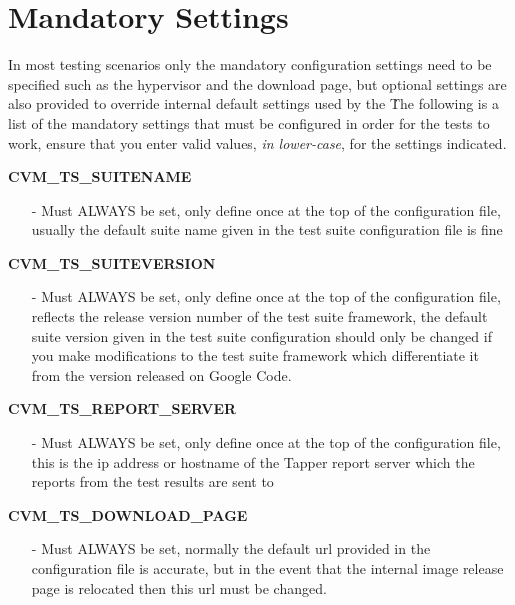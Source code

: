 \section{Mandatory Settings}
\label{sec:mandatorysettings}

In most testing scenarios only the mandatory configuration settings need to be specified such as the hypervisor and 
the download page, but optional settings are also provided to override internal default settings used by the 
\cernvmtestframework\. The following is a list of the mandatory settings that must be configured in order for the
tests to work, ensure that you enter valid values, \emph{in lower-case}, for the settings indicated.




\begin{description}
\item {\bf	 CVM\_TS\_SUITENAME}
		\begin{itemize}
		\item[-]	Must ALWAYS be set, only define once at the top of the configuration file, 
	  		  	usually the default suite name given in the test suite configuration file is fine
		\end{itemize}
	  		  
\item {\bf	 CVM\_TS\_SUITEVERSION}
		\begin{itemize}
		\item[-]	Must ALWAYS be set, only define once at the top of the configuration file,
	  		  	reflects the release version number of the test suite framework, the default 
      		  	suite version given in the test suite configuration should only be changed if 
     		  	you make modifications to the test suite framework which differentiate it from
      		  	the version released on Google Code.
		\end{itemize}

\item {\bf CVM\_TS\_REPORT\_SERVER}
		\begin{itemize}
		\item[-] Must ALWAYS be set, only define once at the top of the configuration file,
      			this is the ip address or hostname of the Tapper report server which the reports
      			from the test results are sent to
		\end{itemize}
		
\item {\bf CVM\_TS\_DOWNLOAD\_PAGE}
		\begin{itemize}
		\item[-]	Must ALWAYS be set, normally the default url provided in the configuration file is
				accurate, but in the event that the internal \cernvm image release page is relocated
				then this url must be changed.
		\end{itemize}


\end{description}
